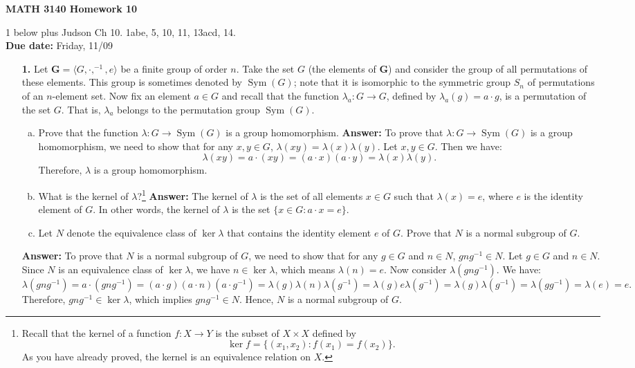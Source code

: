 \documentclass[12pt,reqno]{amsart}
\newcommand{\bG}{\ensuremath{\mathbf{G}}}
\newcommand{\<}{\ensuremath{\langle}}
\renewcommand{\>}{\ensuremath{\rangle}}
\newcommand{\Sym}{\ensuremath{\operatorname{Sym}}}
\newcommand{\subject}{MATH\xspace}
\newcommand{\coursenumber}{3140\xspace}
\begin{document}
\thispagestyle{empty}

\noindent \textbf{\subject \coursenumber Homework 10}

\smallskip

 1 below plus Judson Ch 10. 1abe, 5, 10, 11, 13acd, 14.\\
{\bf Due date:} Friday, 11/09


\medskip

\begin{enumerate}
\item[{\bf 1.}] Let $\bG = \<G, \cdot, ^{-1}, e\>$ be a finite group of order $n$.  
Take the set $G$ (the elements of $\bG$) and consider the group of all
permutations of these elements.  This group is sometimes denoted by $\Sym(G)$;
note that it is isomorphic to the symmetric group $S_n$ of permutations of
an $n$-element set.
Now fix an element $a\in G$ and recall that the function
$\lambda_a: G \rightarrow G$, defined by $\lambda_a(g) = a\cdot g$, is a
permutation of the set $G$.  That is, $\lambda_a$ belongs to the
permutation group $\Sym(G)$.
\begin{enumerate}[(a)]
\item 
Prove that the function $\lambda: G \rightarrow \Sym(G)$ is a group
homomorphism.  
\medskip
\textbf{Answer:} To prove that $\lambda: G \rightarrow \Sym(G)$ is a group homomorphism, we need to show that for any $x, y \in G$, $\lambda(xy) = \lambda(x)\lambda(y)$. Let $x, y \in G$. Then we have:
\[\lambda(xy) = a \cdot (xy) = (a \cdot x)(a \cdot y) = \lambda(x)\lambda(y).\]
Therefore, $\lambda$ is a group homomorphism.
\medskip
\item What is the kernel of $\lambda$?\footnote{Recall that the kernel of a function $f: X \rightarrow Y$ is the subset of
  $X\times X$ defined by 
\[
\ker f = \{(x_1,x_2) : f(x_1) = f(x_2)\}.
\]
As you have already proved, the kernel is an equivalence relation on $X$.}
\medskip
\textbf{Answer:} The kernel of $\lambda$ is the set of all elements $x \in G$ such that $\lambda(x) = e$, where $e$ is the identity element of $G$. In other words, the kernel of $\lambda$ is the set $\{x \in G : a \cdot x = e\}$.
\medskip
\item Let $N$ denote the equivalence class of $\ker\lambda$ that contains the
  identity element $e$ of $G$.  Prove that $N$ is a normal subgroup of $G$.
\end{enumerate}
\textbf{Answer:} To prove that $N$ is a normal subgroup of $G$, we need to show that for any $g \in G$ and $n \in N$, $gng^{-1} \in N$. Let $g \in G$ and $n \in N$. Since $N$ is an equivalence class of $\ker\lambda$, we have $n \in \ker\lambda$, which means $\lambda(n) = e$. Now consider $\lambda(gng^{-1})$. We have:
\[\lambda(gng^{-1}) = a \cdot (gng^{-1}) = (a \cdot g)(a \cdot n)(a \cdot g^{-1}) = \lambda(g)\lambda(n)\lambda(g^{-1}) = \lambda(g)e\lambda(g^{-1}) = \lambda(g)\lambda(g^{-1}) = \lambda(gg^{-1}) = \lambda(e) = e.\]
Therefore, $gng^{-1} \in \ker\lambda$, which implies $gng^{-1} \in N$. Hence, $N$ is a normal subgroup of $G$.


\end{enumerate}
\end{document}
